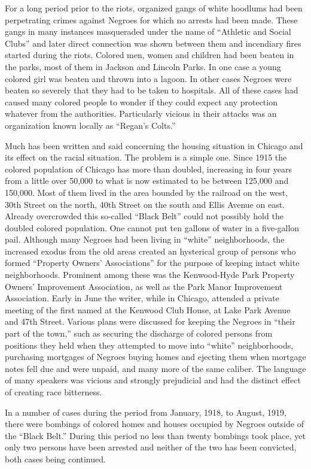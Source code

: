 \documentclass[11pt,article,oneside]{memoir}
\begin{document}
For a long period prior to the riots, organized gangs of white hoodlums
had been perpetrating crimes against Negroes for which no arrests had
been made. These gangs in many instances masqueraded under the name of
``Athletic and Social Clubs'' and later direct connection was shown
between them and incendiary fires started during the riots. Colored men,
women and children had been beaten in the parks, most of them in Jackson
and Lincoln Parks. In one case a young colored girl was beaten and
thrown into a lagoon. In other cases Negroes were beaten so severely
that they had to be taken to hospitals. All of these cases had caused
many colored people to wonder if they could expect any protection
whatever from the authorities. Particularly vicious in their attacks was
an organization known locally as ``Regan's Colts.''

Much has been written and said concerning the housing situation in
Chicago and its effect on the racial situation. The problem is a simple
one. Since 1915 the colored population of Chicago has more than doubled,
increasing in four years from a little over 50,000 to what is now
estimated to be between 125,000 and 150,000. Most of them lived in the
area bounded by the railroad on the west, 30th Street on the north, 40th
Street on the south and Ellis Avenue on east. Already overcrowded this
so-called ``Black Belt'' could not possibly hold the doubled colored
population. One cannot put ten gallons of water in a five-gallon pail.
Although many Negroes had been living in ``white'' neighborhoods, the
increased exodus from the old areas created an hysterical group of
persons who formed ``Property Owners' Associations'' for the purpose of
keeping intact white neighborhoods. Prominent among these was the
Kenwood-Hyde Park Property Owners' Improvement Association, as well as
the Park Manor Improvement Association. Early in June the writer, while
in Chicago, attended a private meeting of the first named at the Kenwood
Club House, at Lake Park Avenue and 47th Street. Various plans were
discussed for keeping the Negroes in ``their part of the town,'' such as
securing the discharge of colored persons from positions they held when
they attempted to move into ``white'' neighborhoods, purchasing
mortgages of Negroes buying homes and ejecting them when mortgage notes
fell due and were unpaid, and many more of the same caliber. The
language of many speakers was vicious and strongly prejudicial and had
the distinct effect of creating race bitterness.

In a number of cases during the period from January, 1918, to August,
1919, there were bombings of colored homes and houses occupied by
Negroes outside of the ``Black Belt.'' During this period no less than
twenty bombings took place, yet only two persons have been arrested and
neither of the two has been convicted, both cases being continued.
\end{document}
